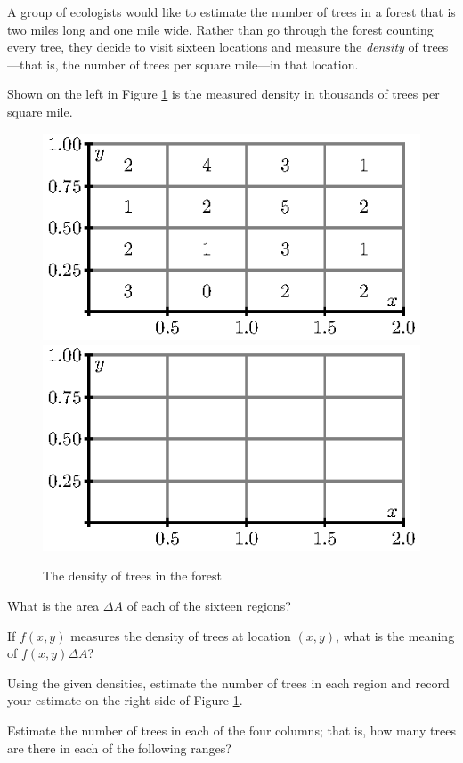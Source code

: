 \begin{pa} \label{PA:11.1} 
  A group of ecologists would like to
  estimate the number of trees in a forest that is two miles long and
  one mile wide.  Rather than go through the forest counting every
  tree, they decide to visit sixteen locations and measure the
  {\em density} of trees---that is, the number of trees per
  square mile---in that location.

  Shown on the left in Figure \ref{F:11.1.forest} is the measured
  density in thousands of trees per square mile.  

  \begin{figure}[ht]
    \begin{center}
      \includegraphics{figures/fig_11_1_forest.eps}
      \hspace*{20pt}
      \includegraphics{figures/fig_11_1_forest_empty.eps}
    \end{center}
    \caption{The density of trees in the forest}
    \label{F:11.1.forest}
  \end{figure}

    \ba
    \item What is the area $\Delta A$ of each of the sixteen regions?
    \item If $f(x,y)$ measures the density of trees at location
      $(x,y)$, what is the meaning of $f(x,y)\Delta A$?
    \item Using the given densities, estimate the number of trees in
      each region and record your estimate on the right side of Figure
      \ref{F:11.1.forest}. 
    \item Estimate the number of trees in each of the four columns;
      that is, how many trees are there in each of the following
      ranges? 


\end{pa}

